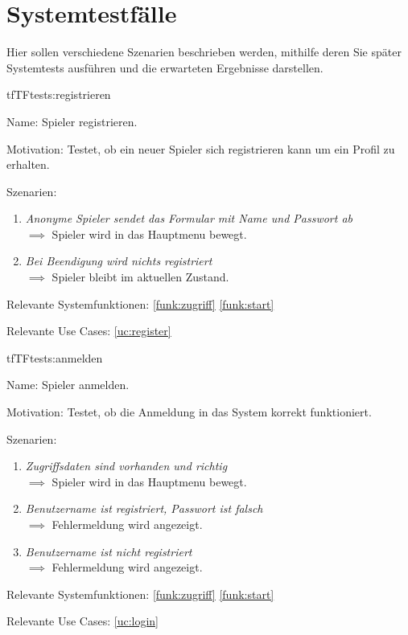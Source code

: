 
\chapter{Systemtestfälle}

Hier sollen verschiedene Szenarien beschrieben werden, mithilfe deren Sie später Systemtests ausführen und die erwarteten Ergebnisse darstellen.

\setcounter{tf}{10}

\begin{description}[leftmargin=5em, style=sameline]

\begin{lhp}{tf}{TF}{tests:registrieren}
	\item [Name:] Spieler registrieren.
	\item [Motivation:] Testet, ob ein neuer Spieler sich registrieren kann um ein Profil zu erhalten.
	\item [Szenarien:] \hfill
		\begin{enumerate}
			\item \textit{Anonyme Spieler sendet das Formular mit Name und Passwort ab} \\
			$\implies$ Spieler wird in das Hauptmenu bewegt.
			\item \textit{Bei Beendigung wird nichts registriert } \\
			$\implies$ Spieler bleibt im aktuellen Zustand.
		\end{enumerate}
	\item [Relevante Systemfunktionen:] \ref{funk:zugriff} \ref{funk:start}
	\item [Relevante Use Cases:] \ref{uc:register}
\end{lhp}

\begin{lhp}{tf}{TF}{tests:anmelden}
	\item [Name:] Spieler anmelden.
	\item [Motivation:] Testet, ob die Anmeldung in das System korrekt funktioniert.
	\item [Szenarien:] \hfill
		\begin{enumerate}
			\item \textit{Zugriffsdaten sind vorhanden und richtig} \\
			$\implies$ Spieler wird in das Hauptmenu bewegt.
			\item \textit{Benutzername ist registriert, Passwort ist falsch} \\
			$\implies$ Fehlermeldung wird angezeigt.
			\item \textit{Benutzername ist nicht registriert} \\
			$\implies$ Fehlermeldung wird angezeigt.
		\end{enumerate}
	\item [Relevante Systemfunktionen:] \ref{funk:zugriff} \ref{funk:start}
	\item [Relevante Use Cases:] \ref{uc:login}
\end{lhp}


\end{description}
